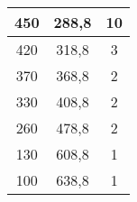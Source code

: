 \begin{table}[h!]
\begin{tabular}{|c|c|c|}
    450                              & 288,8            & 10     \\ \hline
    420                              & 318,8            & 3      \\ \hline
    370                              & 368,8            & 2      \\ \hline
    330                              & 408,8            & 2      \\ \hline
    260                              & 478,8            & 2      \\ \hline
    130                              & 608,8            & 1      \\ \hline
    100                              & 638,8            & 1      \\ \hline
    \end{tabular}
    \centering
    \caption{}
    \label{table:experement2}
\end{table}